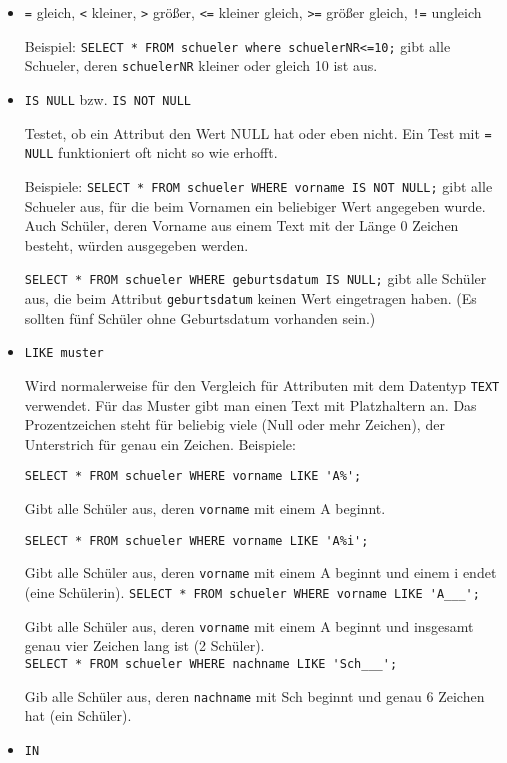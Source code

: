 \begin{itemize}
	\item \lstinline!=! gleich, \lstinline!<! kleiner, \lstinline!>! größer, \lstinline!<=! kleiner gleich, \lstinline!>=! größer gleich, \lstinline&!=& ungleich

	Beispiel: \lstinline!SELECT * FROM schueler where schuelerNR<=10;! gibt alle Schueler, deren \lstinline!schuelerNR! kleiner oder gleich 10 ist aus.
	\item \lstinline!IS NULL! bzw. \lstinline!IS NOT NULL!

	Testet, ob ein Attribut den Wert NULL hat oder eben nicht. Ein Test mit \lstinline|= NULL| funktioniert oft nicht so wie erhofft.

	Beispiele: 	\lstinline!SELECT * FROM schueler WHERE vorname IS NOT NULL;! gibt alle Schueler aus, für die beim Vornamen ein beliebiger Wert angegeben wurde. Auch Schüler, deren Vorname aus einem Text mit der Länge 0 Zeichen besteht, würden ausgegeben werden.

	\lstinline!SELECT * FROM schueler WHERE geburtsdatum IS NULL;! gibt alle Schüler aus, die beim Attribut \lstinline!geburtsdatum! keinen Wert eingetragen haben. (Es sollten fünf Schüler ohne Geburtsdatum vorhanden sein.)
	\item \lstinline!LIKE muster!

	Wird normalerweise für den Vergleich für Attributen mit dem Datentyp \lstinline!TEXT! verwendet. Für das Muster gibt man einen Text mit Platzhaltern an. Das Prozentzeichen steht für beliebig viele (Null oder mehr Zeichen), der Unterstrich für genau ein Zeichen. Beispiele:

	\lstinline!SELECT * FROM schueler WHERE vorname LIKE 'A%';!

	Gibt alle Schüler aus, deren \lstinline!vorname! mit einem A beginnt.

	\lstinline!SELECT * FROM schueler WHERE vorname LIKE 'A%i';!

	Gibt alle Schüler aus, deren \lstinline!vorname! mit einem A beginnt und einem i endet (eine Schülerin).
	\lstinline!SELECT * FROM schueler WHERE vorname LIKE 'A___';!

	Gibt alle Schüler aus, deren \lstinline!vorname! mit einem A beginnt und insgesamt genau vier Zeichen lang ist (2 Schüler).\\
	\lstinline!SELECT * FROM schueler WHERE nachname LIKE 'Sch___';!

	Gib alle Schüler aus, deren \lstinline!nachname! mit Sch beginnt und genau 6 Zeichen hat (ein Schüler).
	\item \lstinline!IN!


\end{itemize}
